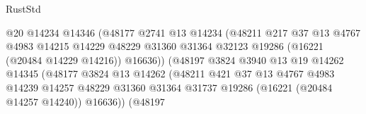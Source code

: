 \begin{lexlean}{RustStd}
\begin{coremodule}
                                          @20
                                          @14234
                                          @14346
                                          (@48177
                                            @2741
                                            @13
                                            @14234
                                            (@48211
                                              @217
                                              @37
                                              @13
                                              @4767
                                              @4983
                                              @14215
                                              @14229
                                              @48229
                                              @31360
                                              @31364
                                              @32123
                                              @19286
                                              (@16221 (@20484 @14229 @14216))
                                              @16636))
                                          (@48197
                                            @3824
                                            @3940
                                            @13
                                            @19
                                            @14262
                                            @14345
                                            (@48177
                                              @3824
                                              @13
                                              @14262
                                              (@48211
                                                @421
                                                @37
                                                @13
                                                @4767
                                                @4983
                                                @14239
                                                @14257
                                                @48229
                                                @31360
                                                @31364
                                                @31737
                                                @19286
                                                (@16221 (@20484 @14257 @14240))
                                                @16636))
                                            (@48197

\end{coremodule}
\end{lexlean}
